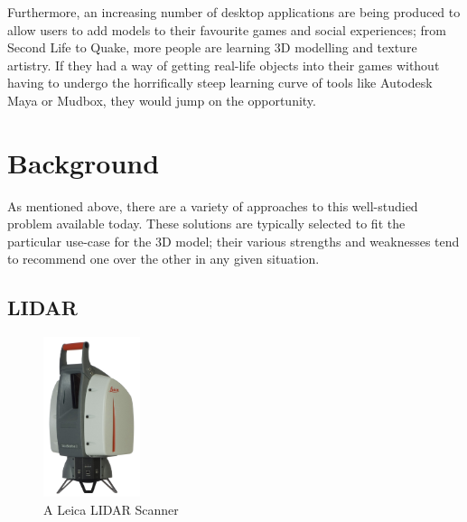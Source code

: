\documentclass[a4paper,10pt]{report}
\begin{document}
Furthermore, an increasing number of desktop applications are being produced to allow users to add models to their favourite games and social experiences; from Second Life to Quake, more people are learning 3D modelling and texture artistry. If they had a way of getting real-life objects into their games without having to undergo the horrifically steep learning curve of tools like Autodesk Maya or Mudbox, they would jump on the opportunity.

\clearpage

\chapter{Background}

As mentioned above, there are a variety of approaches to this well-studied problem available today. These solutions are typically selected to fit the particular use-case for the 3D model; their various strengths and weaknesses tend to recommend one over the other in any given situation.


\section{LIDAR}

\begin{figure}
  \vspace{-30pt}
  \begin{center}
    \includegraphics[width=80pt]{scanstation}
  \end{center}
  \caption{A Leica LIDAR Scanner}
  \label{scanstation}
  \vspace{-10pt}
\end{figure}
\end{document}
